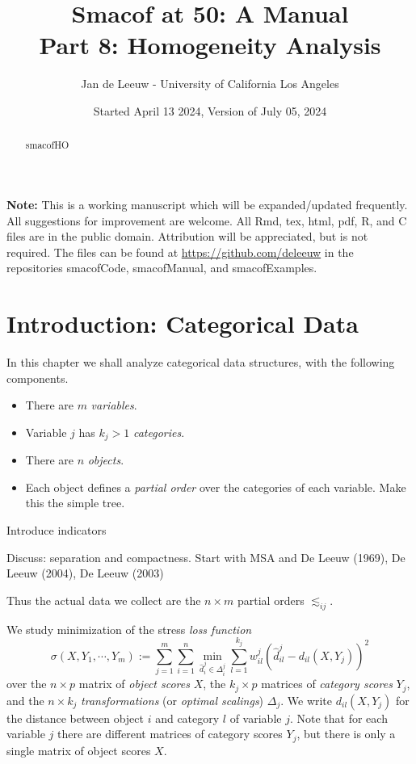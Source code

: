 \documentclass[
  12pt,
]{article}
\title{Smacof at 50: A Manual\\
Part 8: Homogeneity Analysis}
\author{Jan de Leeuw - University of California Los Angeles}
\date{Started April 13 2024, Version of July 05, 2024}
\providecommand{\tightlist}{%
  \setlength{\itemsep}{0pt}\setlength{\parskip}{0pt}}
\begin{document}
\maketitle
\begin{abstract}
smacofHO
\end{abstract}

{
\setcounter{tocdepth}{3}
\tableofcontents
}
\textbf{Note:} This is a working manuscript which will be expanded/updated
frequently. All suggestions for improvement are welcome. All Rmd, tex,
html, pdf, R, and C files are in the public domain. Attribution will be
appreciated, but is not required. The files can be found at
\url{https://github.com/deleeuw} in the repositories smacofCode, smacofManual,
and smacofExamples.

\section{Introduction: Categorical Data}\label{introduction-categorical-data}

In this chapter we shall analyze categorical data structures, with the following components.

\begin{itemize}
\tightlist
\item
  There are \(m\) \emph{variables}.
\item
  Variable \(j\) has \(k_j>1\) \emph{categories}.
\item
  There are \(n\) \emph{objects}.
\item
  Each object defines a \emph{partial order} over the categories of each variable. Make this the simple tree.
\end{itemize}

Introduce indicators

Discuss: separation and compactness. Start with MSA and De Leeuw (1969),
De Leeuw (2004), De Leeuw (2003)

Thus the actual data we collect are the \(n\times m\) partial orders \(\lesssim_{ij}\).

We study minimization of the stress \emph{loss function}
\begin{equation}
\sigma(X,Y_1,\cdots,Y_m):=\sum_{j=1}^m\sum_{i=1}^n\min_{\hat d_i^j\in\Delta_i^j}\sum_{l=1}^{k_j}w_{il}^j(\hat d_{il}^j-d_{il}(X,Y_j))^2
\label{eq:snmu}
\end{equation}
over the \(n\times p\) matrix of \emph{object scores} \(X\), the \(k_j\times p\)
matrices of \emph{category scores} \(Y_j\), and the \(n\times k_j\) \emph{transformations} (or \emph{optimal scalings}) \(\Delta_j\). We write
\(d_{il}(X,Y_j)\) for the distance between object \(i\) and category
\(l\) of variable \(j\). Note that for each variable \(j\) there are different matrices of category scores \(Y_j\), but there is only a single matrix of object scores \(X\).
\end{document}

